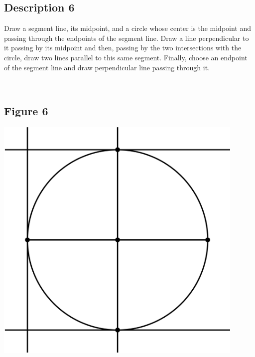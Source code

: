 \documentclass[12pt,a4paper,article,english,firamath]{nsi}
\begin{document}
\maketitle

\subsection*{Description 6}
{\brettley 

Draw a segment line, its midpoint, and a circle whose center is the midpoint and passing through the endpoints of the segment line. Draw a line perpendicular to it passing by its midpoint and then, passing by the two intersections with the circle, draw two lines parallel to this same segment. Finally, choose an endpoint of the segment line and draw perpendicular line passing through it.}\\[1em]



\subsection*{Figure 6}
\begin{center}
    \includegraphics[height=12cm]{img/fig06.png}
\end{center}
\end{document}
